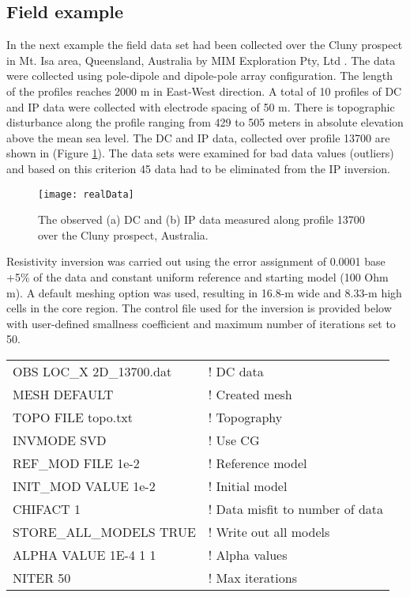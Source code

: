 \subsection{Field example}
In the next example the field data set had been collected over the Cluny prospect in Mt. Isa area, Queensland, Australia by MIM Exploration Pty, Ltd \cite[]{Rutley01}. The data were collected using pole-dipole and dipole-pole array configuration. The length of the profiles reaches 2000 m in East-West direction. A total of 10 profiles of DC and IP data were collected with electrode spacing of 50 m. There is topographic disturbance along the profile ranging from 429 to 505 meters in absolute elevation above the mean sea level. The DC and IP data, collected over profile 13700 are shown in (Figure \ref{fig:realData}). The data sets were examined for bad data values (outliers) and based on this criterion 45 data had to be eliminated from the IP inversion.
%
\begin{figure}
\centering
\texttt{[image: realData]}
\caption{The observed (a) DC and (b) IP data measured along profile 13700 over the Cluny prospect, Australia.}
\label{fig:realData}
\end{figure}

Resistivity inversion was carried out using the error assignment of 0.0001 base +5\% of the data and constant uniform reference and starting model (100 Ohm m). A default meshing option was used, resulting in 16.8-m wide and 8.33-m high cells in the core region. The control file used for the inversion is provided below with user-defined smallness coefficient and maximum number of iterations set to 50.
%
\begin{fileExample}
\begin{tabular}{|ll|}
\hline
OBS LOC\_X 2D\_13700.dat & ! DC data \\
MESH DEFAULT & ! Created mesh \\
TOPO FILE topo.txt & ! Topography\\
INVMODE SVD & ! Use CG \\
REF\_MOD FILE 1e-2 & ! Reference model \\
INIT\_MOD VALUE 1e-2 & ! Initial model \\
CHIFACT 1 & ! Data misfit to number of data \\
STORE\_ALL\_MODELS TRUE & ! Write out all models \\
ALPHA VALUE 1E-4 1 1 & ! Alpha values \\
NITER 50 & ! Max iterations \\
\hline
\end{tabular}
\end{fileExample}

